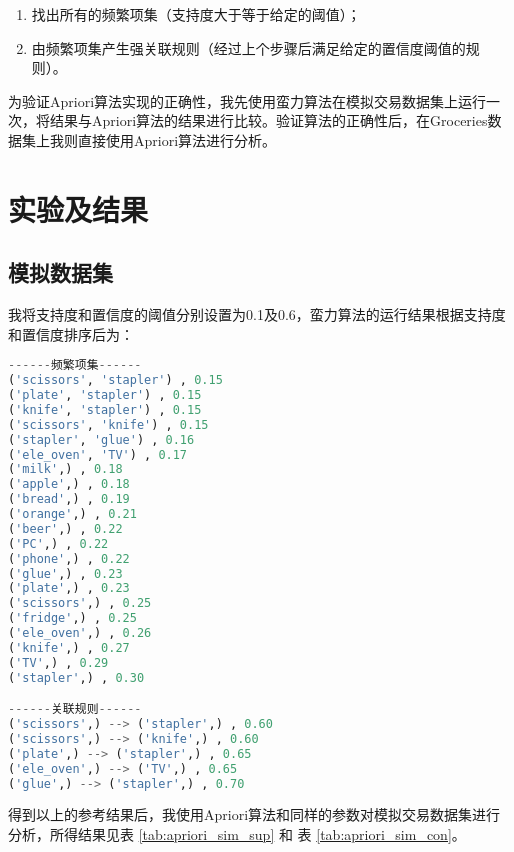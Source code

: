 \documentclass[12pt,a4paper]{article}
\theoremstyle{definition}
\begin{document}
\begin{enumerate}

\item 找出所有的频繁项集（支持度大于等于给定的阈值）；

\item 由频繁项集产生强关联规则（经过上个步骤后满足给定的置信度阈值的规则）。

\end{enumerate}

为验证Apriori算法实现的正确性，我先使用蛮力算法在模拟交易数据集上运行一次，将结果与Apriori算法的结果进行比较。验证算法的正确性后，在Groceries数据集上我则直接使用Apriori算法进行分析。


\section{实验及结果}

\subsection{模拟数据集}

我将支持度和置信度的阈值分别设置为0.1及0.6，蛮力算法的运行结果根据支持度和置信度排序后为：

\begin{lstlisting}[language=Python,
	keywordstyle=\color{blue!70},
	frame=shadowbox,
	breaklines=True]
------频繁项集------
('scissors', 'stapler') , 0.15
('plate', 'stapler') , 0.15
('knife', 'stapler') , 0.15
('scissors', 'knife') , 0.15
('stapler', 'glue') , 0.16
('ele_oven', 'TV') , 0.17
('milk',) , 0.18
('apple',) , 0.18
('bread',) , 0.19
('orange',) , 0.21
('beer',) , 0.22
('PC',) , 0.22
('phone',) , 0.22
('glue',) , 0.23
('plate',) , 0.23
('scissors',) , 0.25
('fridge',) , 0.25
('ele_oven',) , 0.26
('knife',) , 0.27
('TV',) , 0.29
('stapler',) , 0.30

------关联规则------
('scissors',) --> ('stapler',) , 0.60
('scissors',) --> ('knife',) , 0.60
('plate',) --> ('stapler',) , 0.65
('ele_oven',) --> ('TV',) , 0.65
('glue',) --> ('stapler',) , 0.70
\end{lstlisting}

得到以上的参考结果后，我使用Apriori算法和同样的参数对模拟交易数据集进行分析，所得结果见表 \ref{tab:apriori_sim_sup} 和 表 \ref{tab:apriori_sim_con}。
\end{document}
